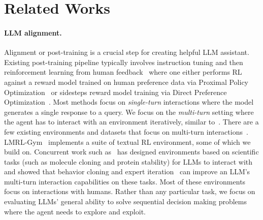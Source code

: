 \section{Related Works}


\paragraph{LLM alignment.} Alignment or post-training is a crucial step for creating helpful LLM assistant. Existing post-training pipeline typically involves instruction tuning and then reinforcement learning from human feedback~\citep[RLHF]{christiano2017deep} where one either performs RL against a reward model trained on human preference data via Proximal Policy Optimization~\citep[PPO]{schulman2017proximal} or sidesteps reward model training via Direct Preference Optimization~\citep[DPO]{rafailov2024direct}. Most methods focus on \textit{single-turn} interactions where the model generates a single response to a query. We focus on the \emph{multi-turn} setting where the agent has to interact with an environment iteratively, similar to~\citet{rafailov2024rqlanguagemodel}. There are a few existing environments and datasets that focus on multi-turn interactions~\citep{abdulhai2023lmrl, sun2023parrot, kwan2024mt, wang2024mint}. LMRL-Gym~\citep{abdulhai2023lmrl} implements a suite of textual RL environment, some of which we build on. Concurrent work such as~\citet{narayanan2024aviarytraininglanguageagents} has designed environments based on scientific tasks (such as molecule cloning and protein stability) for LLMs to interact with and showed that behavior cloning and expert iteration~\citep{anthony2017thinkingfastslowdeep,anthony2019policygradientsearchonline,havrilla2024teachinglargelanguagemodels} can improve an LLM's multi-turn interaction capabilities on these tasks. Most of these environments focus on interactions with humans. Rather than any particular task, we focus on evaluating LLMs' general ability to solve sequential decision making problems where the agent needs to explore and exploit.



